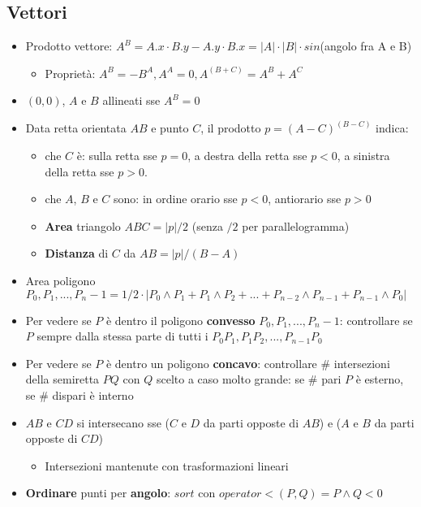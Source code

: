 \documentclass{article}
\begin{document}
\subsection{Vettori}
\begin{itemize}
    \item Prodotto vettore: $A^B = A.x\cdot B.y - A.y\cdot B.x = |A|\cdot|B|\cdot sin$(angolo fra A e B)
    \begin{itemize}
        \item Proprietà: $A^B = -B^A, A^A = 0, A^{(B+C)} = A^B + A^C$
    \end{itemize}
    \item $(0,0)$, $A$ e $B$ allineati sse $A^B = 0$
    \item Data retta orientata $AB$ e punto $C$, il prodotto $p=(A-C)^{(B-C)}$ indica:
    \begin{itemize}
        \item che $C$ è: sulla retta sse $p=0$, a destra della retta sse $p<0$, a sinistra della retta sse $p>0$.
        \item che $A$, $B$ e $C$ sono: in ordine orario sse $p<0$, antiorario sse $p>0$
        \item \textbf{Area} triangolo $ABC = |p|/2$ (senza $/2$ per parallelogramma)
        \item \textbf{Distanza} di $C$ da $AB = |p|/(B-A)$
    \end{itemize}
    \item Area poligono $P_0, P_1, ..., P_n-1 = 1/2 \cdot |P_0 \wedge P_1 + P_1 \wedge P_2 + ... + P_{n-2} \wedge P_{n-1} + P_{n-1} \wedge P_0|$
    \item Per vedere se $P$ è dentro il poligono \textbf{convesso} $P_0, P_1, ..., P_n-1$: controllare se $P$ sempre dalla stessa parte di tutti i $P_0P_1, P_1P_2, ..., P_{n-1}P_0$
    \item Per vedere se $P$ è dentro un poligono \textbf{concavo}: controllare $\#$ intersezioni della semiretta $PQ$ con $Q$ scelto a caso molto grande: se $\#$ pari $P$ è esterno, se $\#$ dispari è interno
    \item $AB$ e $CD$ si intersecano sse ($C$ e $D$ da parti opposte di $AB$) e ($A$ e $B$ da parti opposte di $CD$)
    \begin{itemize}
        \item Intersezioni mantenute con trasformazioni lineari
    \end{itemize}
    \item \textbf{Ordinare} punti per \textbf{angolo}: $sort$ con $operator<(P,Q) = P \wedge Q < 0$
\end{itemize}
\end{document}

